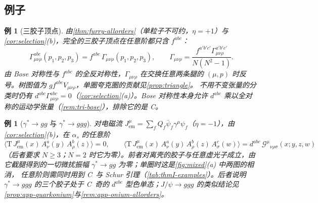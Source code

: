 \documentclass[UTF8,a4paper,11pt,fontset=fandol]{ctexart}
\theoremstyle{cplain}
\theoremstyle{cdefinition}
\newtheorem{example}[theorem]{例}
\theoremstyle{cremark}
\numberwithin{equation}{section}
\begin{document}
\subsection{例子}\label{sec:thmII-examples}

\begin{example}[三胶子顶点]\label{ex:thmII-3g}
由\cref{thm:furry-allorders}（单粒子不可约，$\eta=+1$）与\cref{cor:selection}(b)，完全的三胶子顶点在任意阶都只含 $f^{abc}$：
\begin{equation}\label{eq:thmII-3g}
\Gamma^{abc}_{\mu\nu\rho}(p_1,p_2,p_3)=f^{abc}\,\Gamma_{\mu\nu\rho}(p_1,p_2,p_3),\qquad
\Gamma_{\mu\nu\rho}=\frac{f^{a'b'c'}\Gamma^{a'b'c'}_{\mu\nu\rho}}{N(N^2-1)} .
\end{equation}
由 Bose 对称性与 $f^{abc}$ 的全反对称性，$\Gamma_{\mu\nu\rho}$ 在交换任意两条腿的 $(\mu,p)$ 时反号。树图值为 $gf^{abc}V_{\mu\nu\rho}$，单圈夸克圈的贡献见\cref{prop:triangle}。
不用不变张量的分类时仍有 $d^{abc}\Gamma^{abc}_{\mu\nu\rho}=0$（\cref{cor:selection}(a)）。Bose 对称性本身允许 $d^{abc}$ 乘以全对称的运动学张量（\cref{rem:tri-bose}），排除它的是 C。
\end{example}

\begin{example}[$\gamma^*\to gg$ 与 $\gamma^*\to ggg$]\label{ex:thmII-photon}
对电磁流 $J^\mu_{\mathrm{em}}=\sum_fQ_f\bar\psi_f\gamma^\mu\psi_f$（$\eta=-1$），由\cref{cor:selection}(b)，在 $\alpha_s$ 的任意阶
\begin{equation}\label{eq:thmII-photon}
\bigl\langle\mathrm T\,J^\mu_{\mathrm{em}}(x)\,A^a_\nu(y)\,A^b_\rho(z)\bigr\rangle=0,\qquad
\bigl\langle\mathrm T\,J^\mu_{\mathrm{em}}(x)\,A^a_\nu(y)\,A^b_\rho(z)\,A^c_\sigma(w)\bigr\rangle=d^{abc}\,\mathcal G^\mu{}_{\nu\rho\sigma}(x;y,z,w)
\end{equation}
（后者要求 $N\ge3$；$N=2$ 时它为零）。前者对离壳的胶子与任意虚光子成立，由它截腿得到的一切微扰振幅 $\gamma^*\to gg$ 为零；单圈时这是\cref{fig:mixed}(a) 中两图的相消，
任意阶则需同时用到 C~与 Schur 引理（\cref{tab:thmI-examples}）。后者说明 $\gamma^*\to ggg$ 的三个胶子处于 C~奇的 $d^{abc}$ 型色单态；$J/\psi\to ggg$ 的类似结论见\cref{prop:app-quarkonium}与\cref{rem:app-onium-allorders}。
\end{example}
\end{document}
